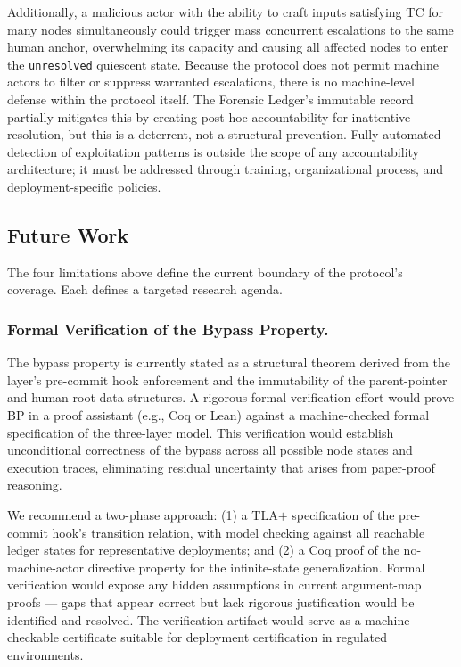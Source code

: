 Additionally, a malicious actor with the ability to craft inputs satisfying TC for many nodes simultaneously could trigger mass concurrent escalations to the same human anchor, overwhelming its capacity and causing all affected nodes to enter the \texttt{unresolved} quiescent state. Because the protocol does not permit machine actors to filter or suppress warranted escalations, there is no machine-level defense within the protocol itself. The Forensic Ledger's immutable record partially mitigates this by creating post-hoc accountability for inattentive resolution, but this is a deterrent, not a structural prevention. Fully automated detection of exploitation patterns is outside the scope of any accountability architecture; it must be addressed through training, organizational process, and deployment-specific policies.

\subsection{Future Work}
\label{sec:future-work}

The four limitations above define the current boundary of the protocol's coverage. Each defines a targeted research agenda.

\subsubsection{Formal Verification of the Bypass Property.}

The bypass property is currently stated as a structural theorem derived from the \fact{} layer's pre-commit hook enforcement and the immutability of the parent-pointer and human-root data structures. A rigorous formal verification effort would prove BP in a proof assistant (e.g., Coq or Lean) against a machine-checked formal specification of the \bxthree{} three-layer model. This verification would establish unconditional correctness of the bypass across all possible node states and execution traces, eliminating residual uncertainty that arises from paper-proof reasoning.

We recommend a two-phase approach: (1) a TLA$+$ specification of the pre-commit hook's transition relation, with model checking against all reachable ledger states for representative deployments; and (2) a Coq proof of the no-machine-actor directive property for the infinite-state generalization. Formal verification would expose any hidden assumptions in current argument-map proofs --- gaps that appear correct but lack rigorous justification would be identified and resolved. The verification artifact would serve as a machine-checkable certificate suitable for deployment certification in regulated environments.

